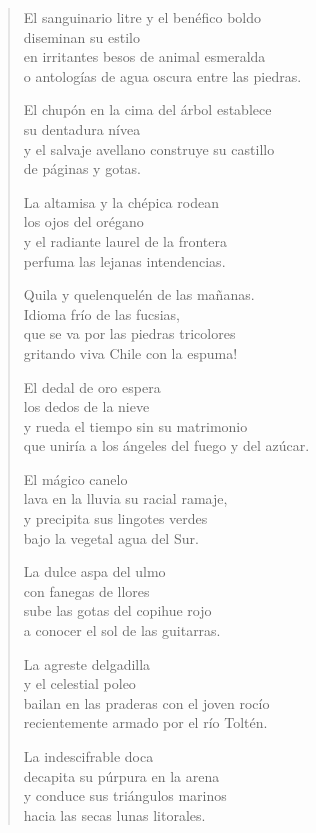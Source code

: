 \documentclass[12pt]{article}
\begin{document}
\clearpage
{}
\begin{verse}

El sanguinario litre y el benéfico boldo\\
diseminan su estilo\\
en irritantes besos de animal esmeralda\\
o antologías de agua oscura entre las piedras.  

El chupón en la cima del árbol establece\\
su dentadura nívea\\
y el salvaje avellano construye su castillo\\
de páginas y gotas.  

La altamisa y la chépica rodean\\
los ojos del orégano\\
y el radiante laurel de la frontera\\
perfuma las lejanas intendencias.  

Quila y quelenquelén de las mañanas.\\
Idioma frío de las fucsias,\\
que se va por las piedras tricolores\\
gritando viva Chile con la espuma!  

El dedal de oro espera\\
los dedos de la nieve\\
y rueda el tiempo sin su matrimonio\\
que uniría a los ángeles del fuego y del azúcar.  

El mágico canelo\\
lava en la lluvia su racial ramaje,\\
y precipita sus lingotes verdes\\
bajo la vegetal agua del Sur.  

La dulce aspa del ulmo\\
con fanegas de llores\\
sube las gotas del copihue rojo\\
a conocer el sol de las guitarras.  

La agreste delgadilla\\
y el celestial poleo\\
bailan en las praderas con el joven rocío\\
recientemente armado por el río Toltén.  

La indescifrable doca\\
decapita su púrpura en la arena\\
y conduce sus triángulos marinos\\
hacia las secas lunas litorales.  


\end{verse}
\end{document}
